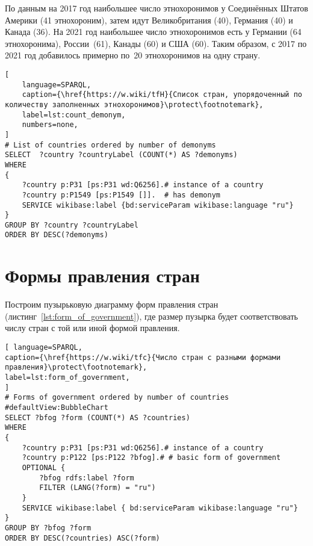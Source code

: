 По данным на 2017 год наибольшее число этнохоронимов у Соединённых Штатов Америки (41 этнохороним), 
затем идут Великобритания (40), 
Германия (40) и Канада (36). 
На 2021 год наибольшее число этнохоронимов есть у Германии (64 этнохоронима), 
России~(61), Канады (60) и США (60). Таким образом, с 2017 по 2021 год добавилось примерно по~20 этнохоронимов на одну страну.




\newpage
\begin{lstlisting}[ 
    language=SPARQL, 
    caption={\href{https://w.wiki/tfH}{Список стран, упорядоченный по количеству заполненных этнохоронимов}\protect\footnotemark},
    label=lst:count_demonym, 
    numbers=none,
]
# List of countries ordered by number of demonyms
SELECT  ?country ?countryLabel (COUNT(*) AS ?demonyms)
WHERE
{
	?country p:P31 [ps:P31 wd:Q6256].# instance of a country
	?country p:P1549 [ps:P1549 []].  # has demonym
	SERVICE wikibase:label {bd:serviceParam wikibase:language "ru"}
}
GROUP BY ?country ?countryLabel 
ORDER BY DESC(?demonyms)
\end{lstlisting}



\section{Формы правления стран}

Построим пузырьковую диаграмму форм правления стран (листинг~\ref{lst:form_of_government}), где размер пузырка будет соответствовать числу стран с той или иной формой правления.


\begin{lstlisting}[ language=SPARQL, 
caption={\href{https://w.wiki/tfc}{Число стран с разными формами правления}\protect\footnotemark},
label=lst:form_of_government, 
]
# Forms of government ordered by number of countries
#defaultView:BubbleChart
SELECT ?bfog ?form (COUNT(*) AS ?countries)
WHERE 
{
	?country p:P31 [ps:P31 wd:Q6256].# instance of a country
	?country p:P122 [ps:P122 ?bfog].# # basic form of government
	OPTIONAL {
		?bfog rdfs:label ?form
		FILTER (LANG(?form) = "ru")
	}
	SERVICE wikibase:label { bd:serviceParam wikibase:language "ru"}
}
GROUP BY ?bfog ?form
ORDER BY DESC(?countries) ASC(?form)
\end{lstlisting}



